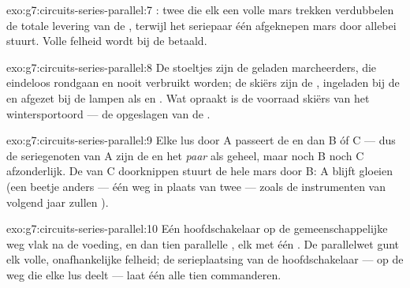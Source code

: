 \begin{solution}{exo:g7:circuits-series-parallel:7}
: twee  die elk een volle mars trekken verdubbelen de
totale levering van de , terwijl het seriepaar één afgeknepen
mars door allebei stuurt. Volle felheid wordt bij de 
betaald.
\end{solution}

\begin{solution}{exo:g7:circuits-series-parallel:8}
De stoeltjes zijn de geladen marcheerders, die eindeloos rondgaan en
nooit verbruikt worden; de skiërs zijn de , ingeladen bij de
 en afgezet bij de lampen als  en . Wat opraakt
is de voorraad skiërs van het wintersportoord --- de opgeslagen
 van de .
\end{solution}

\begin{solution}{exo:g7:circuits-series-parallel:9}
Elke lus door A passeert de  en dan B óf C --- dus de
seriegenoten van A zijn de  en het \emph{paar}
 als geheel, maar noch B noch C afzonderlijk. De  van
C doorknippen stuurt de hele mars door B: A blijft gloeien (een beetje
anders --- één weg in plaats van twee --- zoals de instrumenten van
volgend jaar zullen ).
\end{solution}

\begin{solution}{exo:g7:circuits-series-parallel:10}
Eén hoofdschakelaar op de gemeenschappelijke weg vlak na de voeding,
en dan tien parallelle , elk met één . De
parallelwet gunt elk  volle, onafhankelijke felheid; de
serieplaatsing van de hoofdschakelaar --- op de weg die elke lus deelt
--- laat één  alle tien commanderen.
\end{solution}

